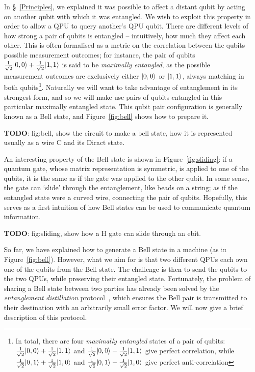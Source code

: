In \S~\ref{Principles}, we explained it was possible to affect a distant qubit by acting on another qubit with which it was entangled. We wish to exploit this property in order to allow a QPU to query another's QPU qubit. There are different levels of how strong a pair of qubits is entangled -- intuitively, how much they affect each other. This is often formalised as a metric on the correlation between the qubits possible measurement outcomes; for instance, the pair of qubits \(\frac{1}{\sqrt{2}}\vert 0,0 \rangle + \frac{1}{\sqrt{2}}\vert 1,1 \rangle\) is said to be \textit{maximally entangled}, as the possible measurement outcomes are exclusively either \(\vert 0,0 \rangle\) or \(\vert 1,1 \rangle\), always matching in both qubits\footnote{In total, there are four \textit{maximally entangled} states of a pair of qubits: \(\frac{1}{\sqrt{2}}\vert 0,0 \rangle + \frac{1}{\sqrt{2}}\vert 1,1 \rangle\) and \(\frac{1}{\sqrt{2}}\vert 0,0 \rangle - \frac{1}{\sqrt{2}}\vert 1,1 \rangle\) give perfect correlation, while \(\frac{1}{\sqrt{2}}\vert 0,1 \rangle + \frac{1}{\sqrt{2}}\vert 1,0 \rangle\) and \(\frac{1}{\sqrt{2}}\vert 0,1 \rangle - \frac{1}{\sqrt{2}}\vert 1,0 \rangle\) give perfect anti-correlation}. Naturally we will want to take advantage of entanglement in its strongest form, and so we will make use pairs of qubits entangled in this particular maximally entangled state. This qubit pair configuration is generally known as a Bell state, and Figure~\ref{fig:bell} shows how to prepare it.

\textbf{TODO}: fig:bell, show the circuit to make a bell state, how it is represented usually as a wire C and its Diract state.

An interesting property of the Bell state is shown in Figure~\ref{fig:sliding}: if a quantum gate, whose matrix representation is symmetric, is applied to one of the qubits, it is the same as if the gate was applied to the other qubit. In some sense, the gate can `slide' through the entanglement, like beads on a string; as if the entangled state were a curved wire, connecting the pair of qubits. Hopefully, this serves as a first intuition of how Bell states can be used to communicate quantum information.

\textbf{TODO}: fig:sliding, show how a H gate can slide through an ebit.

So far, we have explained how to generate a Bell state in a machine (as in Figure~\ref{fig:bell}). However, what we aim for is that two different QPUs each own one of the qubits from the Bell state. The challenge is then to send the qubits to the two QPUs, while preserving their entangled state. Fortunately, the problem of sharing a Bell state between two parties has already been solved by the \textit{entanglement distillation} protocol~\citep{DistillationProtocol}, which ensures the Bell pair is transmitted to their destination with an arbitrarily small error factor. We will now give a brief description of this protocol.

